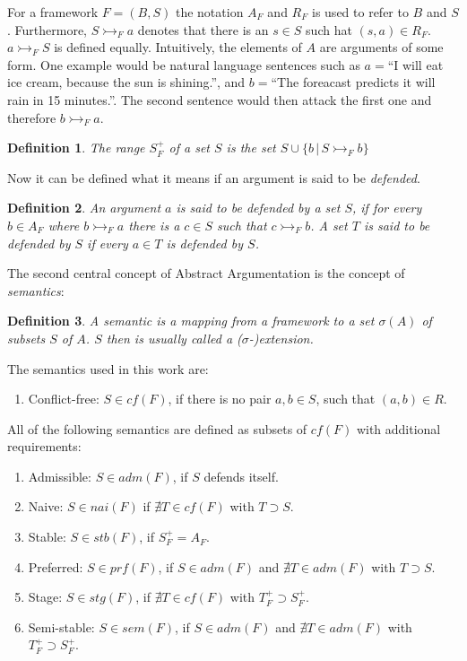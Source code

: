 \documentclass[parskip=half]{scrartcl}
\newtheorem{definition}{Definition}
\begin{document}
For a framework $F = (B, S)$ the notation $A_F$ and $R_F$ is
used to refer to $B$ and $S$. Furthermore, $S \rightarrowtail_F a$ denotes that
there is an $s \in S$ such hat $(s, a) \in R_F$. $a \rightarrowtail_F S$ is
defined equally. Intuitively, the elements of $A$ are arguments of some form.
One example would be natural language sentences such as $a=$``I will eat ice
cream, because the sun is shining.'', and $b=$``The foreacast predicts it will
rain in 15 minutes.''. The second sentence would then attack the first one and
therefore $b \rightarrowtail_F a$.
\begin{definition}
The \emph{range} $S_F^{+}$ of a set $S$ is the
set $S \cup\{b\,|\,S \rightarrowtail_F b\}$
\end{definition}

Now it can be defined what it means if an argument is said to be
\emph{defended}.
\begin{definition}
An argument $a$ is said to be \emph{defended} by a set $S$, if for every $b \in
A_F$ where $b \rightarrowtail_F a$ there is a $c \in S$ such that $c
\rightarrowtail_F b$. A set $T$ is said to be \emph{defended} by $S$ if every
$a \in T$ is defended by $S$.
\end{definition}

The second central concept of Abstract Argumentation is the concept of
 \emph{semantics}:
\begin{definition}
A \emph{semantic} is a mapping from a framework to a set $\sigma(A)$ of subsets
$S$ of $A$.  $S$ then is usually called a ($\sigma$-)extension.
\end{definition}

The semantics used in this work are:
\begin{enumerate}
  \item Conflict-free: $S \in cf(F)$, if there is no pair $a,b \in S$, such that
      $(a,b) \in R$.
\end{enumerate}
All of the following semantics are defined as subsets of $cf(F)$
with additional requirements:
\begin{enumerate}[resume]
  \item Admissible: $S \in adm(F)$, if $S$ defends itself.
  \item Naive: $S \in nai(F)$ if $\nexists T\in cf(F)$ with $T \supset S$.
  \item Stable: $S \in stb(F)$, if $S_F^{+} = A_F$.
  \item Preferred: $S \in prf(F)$, if $S \in adm(F)$ and $\nexists T\in adm(F)$
      with $T \supset S$.
  \item Stage: $S \in stg(F)$, if $\nexists T\in cf(F)$ with $T_F^{+} \supset
      S_F^{+}$.
  \item Semi-stable: $S \in sem(F)$, if $S \in adm(F)$ and $\nexists T\in
      adm(F)$ with $T_F^{+} \supset S_F^{+}$.
\end{enumerate}
\end{document}
